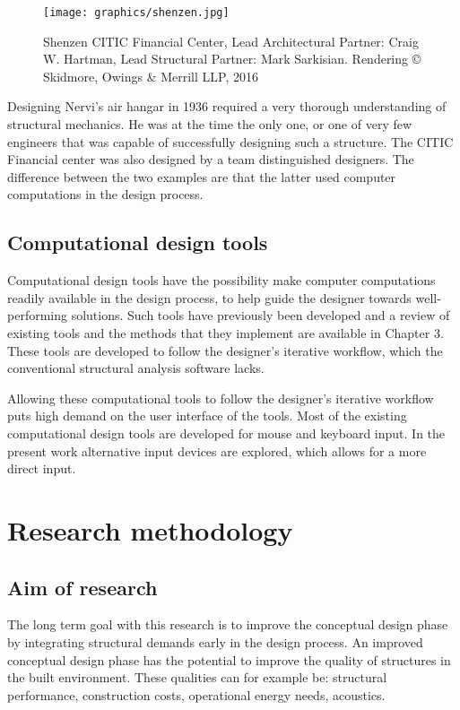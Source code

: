 \begin{figure}
  \texttt{[image: graphics/shenzen.jpg]}
  \caption{Shenzen CITIC Financial Center, Lead Architectural Partner: Craig W. Hartman, Lead Structural Partner: Mark Sarkisian.  Rendering © Skidmore, Owings \& Merrill LLP, 2016}
  \label{fig:Shenzen}
\end{figure}

Designing Nervi’s air hangar in 1936 required a very thorough understanding of structural mechanics. He was at the time the only one, or one of very few engineers that was capable of successfully designing such a structure. The CITIC Financial center was also designed by a team distinguished designers. The difference between the two examples are that the latter used computer computations in the design process. 

\subsection{Computational design tools}
Computational design tools have the possibility make computer computations readily available in the design process, to help guide the designer towards well-performing solutions. Such tools have previously been developed and a review of existing tools and the methods that they implement are available in Chapter 3. These tools are developed to follow the designer’s iterative workflow, which the conventional structural analysis software lacks. 

Allowing these computational tools to follow the designer’s iterative workflow puts high demand on the user interface of the tools. Most of the existing computational design tools are developed for mouse and keyboard input. In the present work alternative input devices are explored, which allows for a more direct input. 

\section{Research methodology }
\subsection{Aim of research}
The long term goal with this research is to improve the conceptual design phase by integrating structural demands early in the design process. An improved conceptual design phase has the potential to improve the quality of structures in the built environment. These qualities can for example be: structural performance, construction costs, operational energy needs, acoustics.


